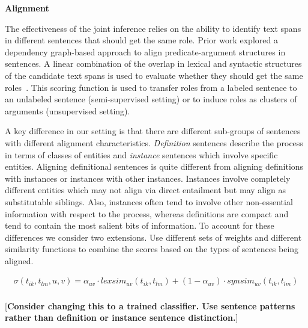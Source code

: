{\bf Alignment}

The effectiveness of the joint inference relies on the ability to identify text spans in different sentences that should get the same role. 
Prior work explored a dependency graph-based approach to align predicate-argument structures in sentences. A linear combination of the overlap in lexical and syntactic structures of the candidate text spans is used to evaluate whether they should get the same roles~\cite{furstenau-emnlp2009,furstenau2012semi,lang-naacl2010}.
This scoring function is used to transfer roles from a labeled sentence to an unlabeled sentence (semi-supervised setting) or to induce roles as clusters of arguments (unsupervised setting). 

A key difference in our setting is that there are different sub-groups of sentences with different alignment characteristics. 
{\em Definition} sentences describe the process in terms of classes of entities and {\em instance} sentences which involve specific entities.
Aligning definitional sentences is quite different from aligning definitions with instances or instances with other instances. 
Instances involve completely different entities which may not align via direct entailment but may align as substitutable siblings.
Also, instances often tend to involve other non-essential information with respect to the process, 
whereas definitions are compact and tend to contain the most salient bits of information. 
To account for these differences we consider two extensions. Use different sets of weights and different similarity functions to combine the scores based on the types of sentences being aligned.

\begin{align*}
\sigma(t_{ik}, t_{lm}, u, v)	= \alpha_{uv} \cdot lexsim_{uv}(t_{ik}, t_{lm}) + (1 - \alpha_{uv}) \cdot synsim_{uv}(t_{ik}, t_{lm})\\
\end{align*}

[{\bf Consider changing this to a trained classifier. Use sentence patterns rather than definition or instance sentence distinction.}]


